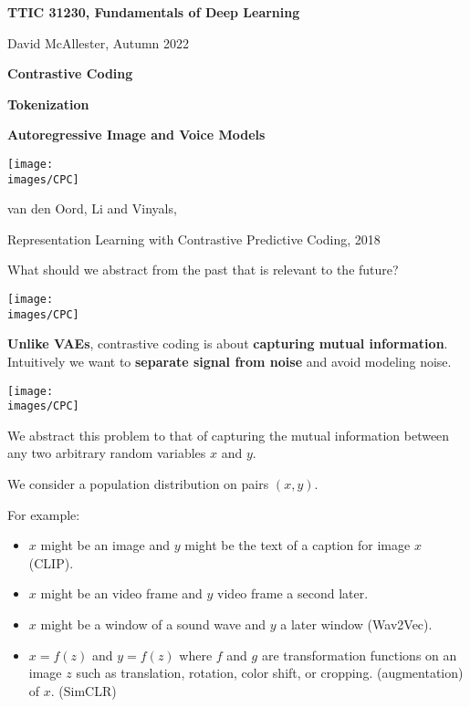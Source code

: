 





{\Huge
  \centerline{\bf TTIC 31230,  Fundamentals of Deep Learning}
  \vfill
  \centerline{David McAllester, Autumn   2022}
  \vfill
  \centerline{\bf Contrastive Coding}
  \vfill
  \centerline{\bf Tokenization}
  
  \vfill
  \centerline{\bf Autoregressive Image and Voice Models}
  \vfill
  \vfill

\centerline{\texttt{[image: \\images/CPC]}}
\centerline{\huge van den Oord, Li and Vinyals,}
\centerline{\huge Representation Learning with Contrastive Predictive Coding, 2018}

\vfill
What should we abstract from the past that is relevant to the future?

\centerline{\texttt{[image: \\images/CPC]}}

\vfill
{\bf Unlike VAEs}, contrastive coding is about {\bf capturing mutual information}.
Intuitively we want to {\bf separate signal from noise} and avoid modeling noise.

\centerline{\texttt{[image: \\images/CPC]}}

\vfill
We abstract this problem to that of capturing the mutual information between any two arbitrary random variables $x$ and $y$.


 We consider a population distribution on pairs $(x,y)$.
 
 \vfill
 For example:
 
 \vfill
\begin{itemize}
\item $x$ might be an image and $y$ might be the text of a caption for image $x$ (CLIP).

\vfill
\item $x$ might be an video frame and $y$ video frame a second later.

\vfill
\item $x$ might be a window of a sound wave and $y$ a later window (Wav2Vec).

\vfill
\item $x = f(z)$ and $y = f(z)$ where $f$ and $g$ are transformation functions on an image $z$ such as  translation, rotation, color shift, or cropping. (augmentation) of $x$. (SimCLR)
\end{itemize}

}
